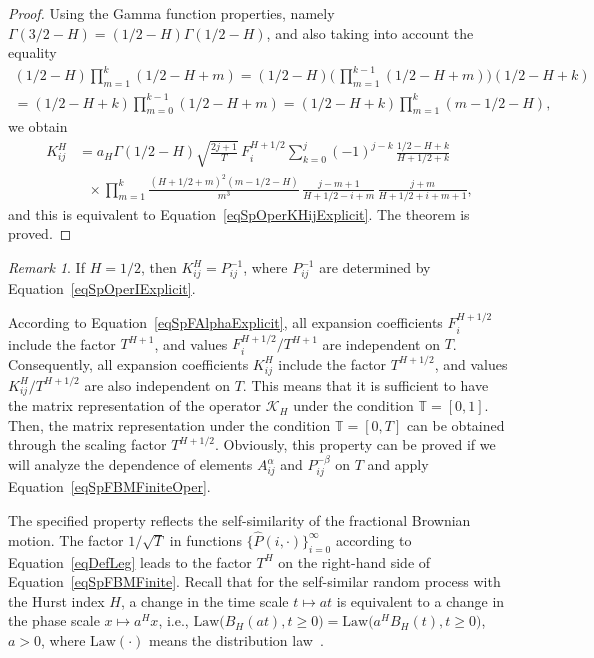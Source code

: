 \documentclass[10pt,reqno]{amsart}
\theoremstyle{plain}
\theoremstyle{remark}
\newtheorem{remark}{Remark}
\newcommand{\ck}{\mathcal{K}}
\begin{document}
\begin{proof}
Using the Gamma function properties, namely $\Gamma(3/2-H) = (1/2-H) \Gamma(1/2-H)$, and also taking into account the equality
\begin{gather*}
  (1/2-H) \prod\limits_{m=1}^k (1/2-H+m) = (1/2-H) \biggl( \, \prod\limits_{m=1}^{k-1} (1/2-H+m) \biggr) (1/2-H+k) \\
  = (1/2-H+k) \prod\limits_{m=0}^{k-1} (1/2-H+m) = (1/2-H+k) \prod\limits_{m=1}^k (m-1/2-H),
\end{gather*}
we obtain
\begin{align*}
  K_{ij}^H & = a_H \Gamma(1/2-H) \sqrt{\frac{2j+1}{T}} \, F_i^{H+1/2} \sum\limits_{k=0}^j (-1)^{j-k} \, \frac{1/2-H+k}{H+1/2+k} \\
  & \ \ \ {} \times \prod\limits_{m=1}^k \frac{(H+1/2+m)^2 (m-1/2-H)}{m^3} \, \frac{j-m+1}{H+1/2-i+m} \, \frac{j+m}{H+1/2+i+m+1},
\end{align*}
and this is equivalent to Equation~\eqref{eqSpOperKHijExplicit}. The theorem is proved.
\end{proof}

\begin{remark}\label{remBM}
If $H = 1/2$, then $K_{ij}^H = P_{ij}^{-1}$, where $P_{ij}^{-1}$ are determined by Equation~\eqref{eqSpOperIExplicit}.
\end{remark}

According to Equation~\eqref{eqSpFAlphaExplicit}, all expansion coefficients $F_i^{H+1/2}$ include the factor $T^{H+1}$, and values $F_i^{H+1/2} / T^{H+1}$ are independent on $T$. Consequently, all expansion coefficients $K_{ij}^H$ include the factor $T^{H+1/2}$, and values $K_{ij}^H / T^{H+1/2}$ are also independent on $T$. This means that it is sufficient to have the matrix representation of the operator $\ck_H$ under the condition $\mathds{T} = [0,1]$. Then, the matrix representation under the condition $\mathds{T} = [0,T]$ can be obtained through the scaling factor $T^{H+1/2}$. Obviously, this property can be proved if we will analyze the dependence of elements $A_{ij}^\alpha$ and $P_{ij}^{-\beta}$ on $T$ and apply Equation~\eqref{eqSpFBMFiniteOper}.

The specified property reflects the self-similarity of the fractional Brownian motion. The factor $1/\sqrt{T}$ in functions $\{\hat P(i,\cdot)\}_{i=0}^\infty$ according to Equation~\eqref{eqDefLeg} leads to the factor $T^H$ on the right-hand side of Equation~\eqref{eqSpFBMFinite}. Recall that for the self-similar random process with the Hurst index $H$, a change in the time scale $t \mapsto at$ is equivalent to a change in the phase scale $x \mapsto a^H x$, i.e., $\mathrm{Law} \bigl( B_H(at), t \geqslant 0 \bigr) = \mathrm{Law} \bigl( a^H B_H(t), t \geqslant 0 \bigr)$, $a > 0$, where $\mathrm{Law}(\cdot)$ means the distribution law~\cite{Shi_99}.
\end{document}

